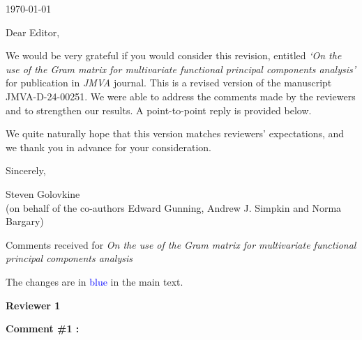 \documentclass[11pt]{article}
\begin{document}
\qquad

\qquad

\qquad


\qquad

\qquad

\qquad

\newcommand{\thedate}{\today}

\thedate

\qquad

\qquad

\qquad



Dear Editor,

\qquad


We would be very grateful if you would consider this revision, entitled \emph{`On the use of the Gram matrix for multivariate functional principal components analysis'} for publication in \emph{JMVA} journal. This is a revised version of the manuscript JMVA-D-24-00251. We were able to address the comments made by the reviewers and to strengthen our results. A point-to-point reply is provided below. 

\quad

We quite naturally hope that this version matches reviewers' expectations, and we thank you in advance for your consideration.



\quad


Sincerely, 

\medskip



 Steven Golovkine 
 \\(on behalf of the co-authors  Edward Gunning, Andrew J. Simpkin and Norma Bargary)





\newpage


\begin{center}
{\large Comments received for \emph{On the use of the Gram matrix for multivariate functional principal components analysis}}\\
\end{center} 


The changes are in \textcolor{blue}{blue} in the main text.
\vspace*{1cm}


{\large \textbf{Reviewer 1} }


\bigskip

\itshape


\textbf{Comment \#1 :}
\end{document}
